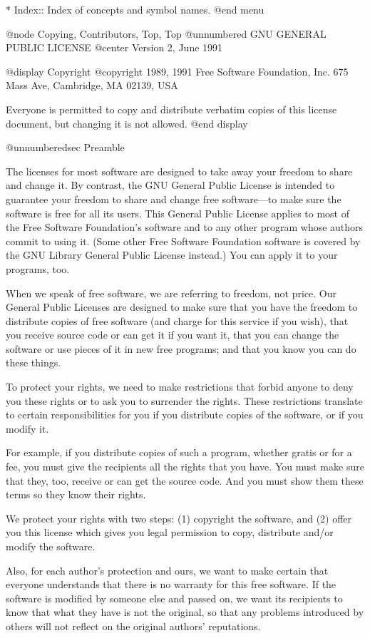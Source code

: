 * Index::	    Index of concepts and symbol names.
@end menu

@node Copying, Contributors, Top, Top
@unnumbered GNU GENERAL PUBLIC LICENSE
@center Version 2, June 1991

@display
Copyright @copyright{} 1989, 1991 Free Software Foundation, Inc.
675 Mass Ave, Cambridge, MA 02139, USA

Everyone is permitted to copy and distribute verbatim copies
of this license document, but changing it is not allowed.
@end display

@unnumberedsec Preamble

  The licenses for most software are designed to take away your
freedom to share and change it.  By contrast, the GNU General Public
License is intended to guarantee your freedom to share and change free
software---to make sure the software is free for all its users.  This
General Public License applies to most of the Free Software
Foundation's software and to any other program whose authors commit to
using it.  (Some other Free Software Foundation software is covered by
the GNU Library General Public License instead.)  You can apply it to
your programs, too.

  When we speak of free software, we are referring to freedom, not
price.  Our General Public Licenses are designed to make sure that you
have the freedom to distribute copies of free software (and charge for
this service if you wish), that you receive source code or can get it
if you want it, that you can change the software or use pieces of it
in new free programs; and that you know you can do these things.

  To protect your rights, we need to make restrictions that forbid
anyone to deny you these rights or to ask you to surrender the rights.
These restrictions translate to certain responsibilities for you if you
distribute copies of the software, or if you modify it.

  For example, if you distribute copies of such a program, whether
gratis or for a fee, you must give the recipients all the rights that
you have.  You must make sure that they, too, receive or can get the
source code.  And you must show them these terms so they know their
rights.

  We protect your rights with two steps: (1) copyright the software, and
(2) offer you this license which gives you legal permission to copy,
distribute and/or modify the software.

  Also, for each author's protection and ours, we want to make certain
that everyone understands that there is no warranty for this free
software.  If the software is modified by someone else and passed on, we
want its recipients to know that what they have is not the original, so
that any problems introduced by others will not reflect on the original
authors' reputations.

